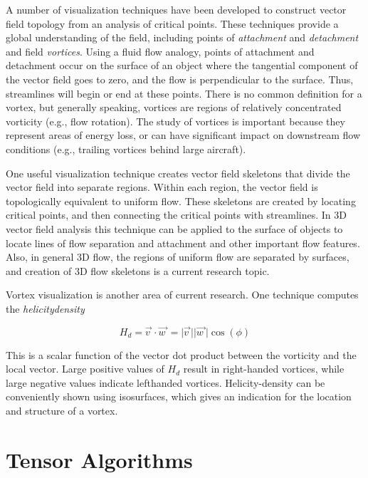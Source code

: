 A number of visualization techniques have been developed to construct vector field topology from an analysis of critical points. These techniques provide a global understanding of the field, including points of \emph{attachment} and \emph{detachment} and field \emph{vortices}. Using a fluid flow analogy, points of attachment and detachment occur on the surface of an object where the tangential component of the vector field goes to zero, and the flow is perpendicular to the surface. Thus, streamlines will begin or end at these points. There is no common definition for a vortex, but generally speaking, vortices are regions of relatively concentrated vorticity (e.g., flow rotation). The study of vortices is important because they represent areas of energy loss, or can have significant impact on downstream flow conditions (e.g., trailing vortices behind large aircraft).

One useful visualization technique creates vector field skeletons that divide the vector field into separate regions. Within each region, the vector field is topologically equivalent to uniform flow. These skeletons are created by locating critical points, and then connecting the critical points with streamlines. In 3D vector field analysis this technique can be applied to the surface of objects to locate lines of flow separation and attachment and other important flow features. Also, in general 3D flow, the regions of uniform flow are separated by surfaces, and creation of 3D flow skeletons is a current research topic.

Vortex visualization is another area of current research. One technique computes the \emph{helicitydensity}

\begin{equation}\label{eq:9.12}
H_d = \overrightarrow{v\ } \cdot \overrightarrow{w\ } = \vert \overrightarrow{v\ } \vert \vert \overrightarrow{w\ } \vert \cos(\phi)
\end{equation}

This is a scalar function of the vector dot product between the vorticity and the local vector. Large positive values of $H_d$ result in right-handed vortices, while large negative values indicate lefthanded vortices. Helicity-density can be conveniently shown using isosurfaces, which gives an indication for the location and structure of a vortex.

\section{Tensor Algorithms}

